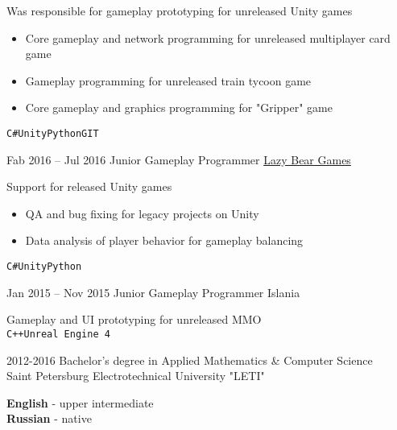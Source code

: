 \documentclass[9pt]{developercv} %
\begin{document}
\begin{entrylist}
{	Was responsible for gameplay prototyping for unreleased Unity games
	\begin{itemize}
		\item Core gameplay and network programming for unreleased multiplayer card game
		\item Gameplay programming for unreleased train tycoon game
		\item Core gameplay and graphics programming for "Gripper" game
	\end{itemize}
	{\texttt{C\#}\slashsep\texttt{Unity}\slashsep\texttt{Python}\slashsep\texttt{GIT}}
	}
	\entry
	{Fab 2016 -- Jul 2016}
	{Junior Gameplay Programmer}
	{\href{http://lazybeargames.com/}{Lazy Bear Games}}
	{

	Support for released Unity games
	\begin{itemize}
		\item QA and bug fixing for legacy projects on Unity
		\item Data analysis of player behavior for gameplay balancing
	\end{itemize}
	{\texttt{C\#}\slashsep\texttt{Unity}\slashsep\texttt{Python}}
	}
	\entry
	{Jan 2015 -- Nov 2015}
	{Junior Gameplay Programmer}
	{Islania}
	{

	Gameplay and UI prototyping for unreleased MMO \\ {\texttt{C++}\slashsep\texttt{Unreal Engine 4}}
	}
\end{entrylist}



\begin{entrylist}
	\entry
	{2012-2016}
	{Bachelor's degree in Applied Mathematics \& Computer Science \\ \footnotesize{Saint Petersburg Electrotechnical University "LETI"} }
	{}
	{}
\end{entrylist}


\begin{minipage}[t]{0.5\textwidth}
	\vspace{-\baselineskip} %


	\textbf{English} - upper intermediate\\
	\textbf{Russian} - native
\end{minipage}
\hfill

\end{document}
